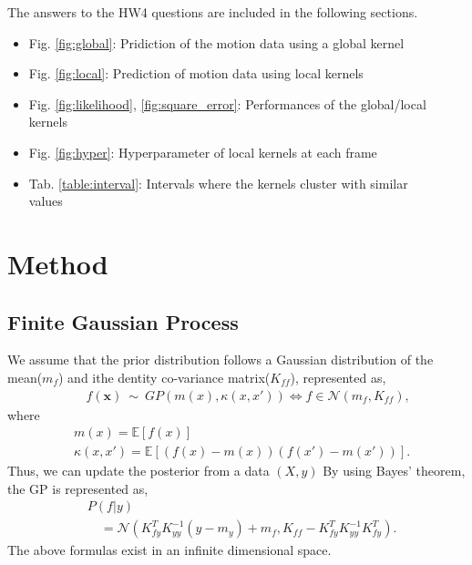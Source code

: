 \documentclass[conference]{IEEEtran}
\begin{document}
The answers to the HW4 questions are included in the following sections.
\begin{itemize}
\item Fig. \ref{fig:global}: Pridiction of the motion data using a global kernel
\item Fig. \ref{fig:local}: Prediction of motion data using local kernels
\item Fig. \ref{fig:likelihood}, \ref{fig:square_error}: Performances of the global/local kernels
\item Fig. \ref{fig:hyper}: Hyperparameter of local kernels at each frame 
\item Tab. \ref{table:interval}: Intervals where the kernels cluster with similar\\
\quad values
\end{itemize}


\section{Method}
\label{sec:method}

\subsection{Finite Gaussian Process}
We assume that the prior distribution follows a Gaussian distribution of the mean($m_f$) and ithe dentity co-variance matrix($K_{ff}$), represented as,
\begin{equation}
\begin{aligned}
    &\quad f(\boldsymbol{x})\ \sim \ GP(m(x),\kappa(x,x')) \Leftrightarrow f \in \mathcal{N}(m_f,K_{ff}),
\end{aligned}
\end{equation}
where
\begin{equation}
\begin{aligned}
    &m(x) = \mathbb{E}[f(x)]\\
    &\kappa(x,x') = \mathbb{E}[(f(x)-m(x))(f(x')-m(x'))].
\end{aligned}
\end{equation}
Thus, we can update the posterior from a data $(X, y)$
By using Bayes' theorem, the GP is represented as,\\
\begin{equation}
\begin{aligned}
    &P(f|y)\\ 
    &\quad = \mathcal{N}(K_{fy}^TK_{yy}^{-1}(y-m_y) +m_f, K_{ff}-K_{fy}^TK_{yy}^{-1}K_{fy}^T).
\end{aligned}
\end{equation}
The above formulas exist in an infinite dimensional space. 
\end{document}
